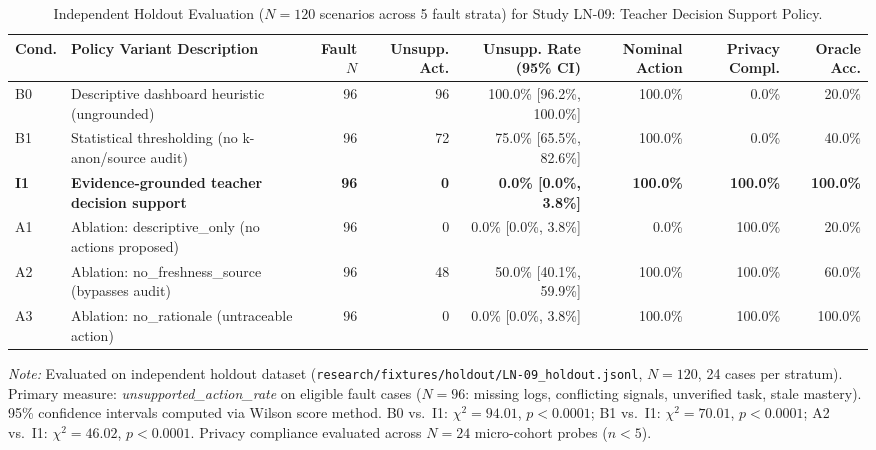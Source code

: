 \begin{table}[t]
\centering
\small
\caption{Independent Holdout Evaluation ($N=120$ scenarios across 5 fault strata) for Study LN-09: Teacher Decision Support Policy.}
\label{tab:ln-09-holdout-results}
\begin{tabular}{llrrrrrr}
\toprule
\textbf{Cond.} & \textbf{Policy Variant Description} & \textbf{Fault $N$} & \textbf{Unsupp. Act.} & \textbf{Unsupp. Rate (95\% CI)} & \textbf{Nominal Action} & \textbf{Privacy Compl.} & \textbf{Oracle Acc.} \\
\midrule
B0 & Descriptive dashboard heuristic (ungrounded) & 96 & 96 & 100.0\% [96.2\%, 100.0\%] & 100.0\% & 0.0\% & 20.0\% \\
B1 & Statistical thresholding (no k-anon/source audit) & 96 & 72 & 75.0\% [65.5\%, 82.6\%] & 100.0\% & 0.0\% & 40.0\% \\
\textbf{I1} & \textbf{Evidence-grounded teacher decision support} & \textbf{96} & \textbf{0} & \textbf{0.0\% [0.0\%, 3.8\%]} & \textbf{100.0\%} & \textbf{100.0\%} & \textbf{100.0\%} \\
A1 & Ablation: descriptive\_only (no actions proposed) & 96 & 0 & 0.0\% [0.0\%, 3.8\%] & 0.0\% & 100.0\% & 20.0\% \\
A2 & Ablation: no\_freshness\_source (bypasses audit) & 96 & 48 & 50.0\% [40.1\%, 59.9\%] & 100.0\% & 100.0\% & 60.0\% \\
A3 & Ablation: no\_rationale (untraceable action) & 96 & 0 & 0.0\% [0.0\%, 3.8\%] & 100.0\% & 100.0\% & 100.0\% \\
\bottomrule
\end{tabular}
\par\smallskip
\begin{minipage}{0.98\textwidth}\footnotesize
\textit{Note:} Evaluated on independent holdout dataset (\texttt{research/fixtures/holdout/LN-09\_holdout.jsonl}, $N=120$, 24 cases per stratum). Primary measure: \textit{unsupported\_action\_rate} on eligible fault cases ($N=96$: missing logs, conflicting signals, unverified task, stale mastery). 95\% confidence intervals computed via Wilson score method. B0 vs.\ I1: $\chi^2 = 94.01$, $p < 0.0001$; B1 vs.\ I1: $\chi^2 = 70.01$, $p < 0.0001$; A2 vs.\ I1: $\chi^2 = 46.02$, $p < 0.0001$. Privacy compliance evaluated across $N=24$ micro-cohort probes ($n < 5$).
\end{minipage}
\end{table}
